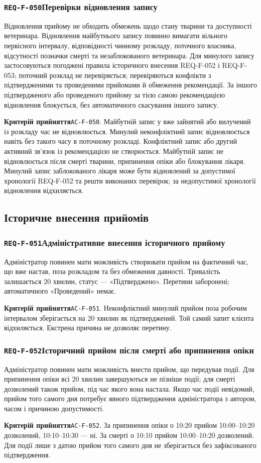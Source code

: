 \documentclass[11pt,a4paper]{article}
\newcommand{\requirement}[4]{%
  \Needspace{7\baselineskip}%
  \subsubsection*{\hypertarget{#1}{\texttt{#1}}\quad #2}%
  #3\par
  \textbf{Критерій прийняття}\quad #4\par\medskip}
\begin{document}
\requirement{REQ-F-050}{Перевірки відновлення запису}{Відновлення прийому не обходить обмежень щодо стану тварини та доступності ветеринара. Відновлення майбутнього запису повинно вимагати вільного первісного інтервалу, відповідності чинному розкладу, поточного власника, відсутності позначки смерті та незаблокованого ветеринара. Для минулого запису застосовуються погоджені правила історичного внесення REQ-F-052 і REQ-F-053; поточний розклад не перевіряється; перевіряються конфлікти з підтвердженими та проведеними прийомами й обмеження рекомендації. За іншого підтвердженого або проведеного прийому за тією самою рекомендацією відновлення блокується, без автоматичного скасування іншого запису.}{\hypertarget{AC-F-050}{\texttt{AC-F-050}}. Майбутній запис у вже зайнятий або вилучений із розкладу час не відновлюється. Минулий неконфліктний запис відновлюється навіть без такого часу в поточному розкладі. Конфліктний запис або другий активний зв’язок із рекомендацією не створюється. Майбутній запис не відновлюється після смерті тварини, припинення опіки або блокування лікаря. Минулий запис заблокованого лікаря може бути відновлений за допустимої хронології REQ-F-052 та решти виконаних перевірок; за недопустимої хронології відновлення відхиляється.}

\subsection{Історичне внесення прийомів}
\requirement{REQ-F-051}{Адміністративне внесення історичного прийому}{Адміністратор повинен мати можливість створювати прийом на фактичний час, що вже настав, поза розкладом та без обмеження давності. Тривалість залишається 20 хвилин, статус — «Підтверджено». Перетини заборонені; автоматичного «Проведений» немає.}{\hypertarget{AC-F-051}{\texttt{AC-F-051}}. Неконфліктний минулий прийом поза робочим інтервалом зберігається на 20 хвилин як підтверджений. Той самий запит клієнта відхиляється. Екстрена причина не дозволяє перетину.}

\requirement{REQ-F-052}{Історичний прийом після смерті або припинення опіки}{Адміністратор повинен мати можливість внести прийом, що передував події. Для припинення опіки всі 20 хвилин завершуються не пізніше події; для смерті дозволений також прийом, під час якого вона настала. Якщо час події невідомий, прийом того самого дня потребує явного підтвердження адміністратора з автором, часом і причиною допустимості.}{\hypertarget{AC-F-052}{\texttt{AC-F-052}}. За припинення опіки о 10:20 прийом 10:00–10:20 дозволений, 10:10–10:30 — ні. За смерті о 10:10 прийом 10:00–10:20 дозволений. Для події лише з датою прийом того самого дня не зберігається без зафіксованого підтвердження.}
\end{document}
